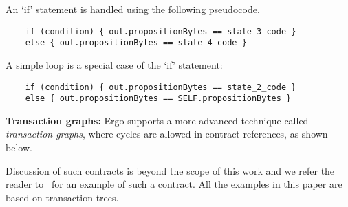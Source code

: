 \documentclass[runningheads]{llncs}
\newcommand{\node}{\mathsf{t}}
\begin{document}

An `if' statement is handled using the following pseudocode. 

\begin{verbatim}
    if (condition) { out.propositionBytes == state_3_code }
    else { out.propositionBytes == state_4_code }
\end{verbatim}

A simple loop is a special case of the `if' statement:
\begin{verbatim}
    if (condition) { out.propositionBytes == state_2_code }
    else { out.propositionBytes == SELF.propositionBytes }
\end{verbatim}


\textbf{Transaction graphs:} Ergo supports a more advanced technique called {\em transaction graphs}, where cycles are allowed in contract references, as shown below. %


Discussion of such contracts is beyond the scope of this work and we refer the reader to~\cite[Section 3.3.3]{advtutorial} for an example of such a contract. All the examples in this paper are based on transaction trees.
\end{document}
